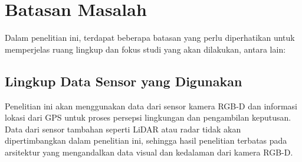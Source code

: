 \section{Batasan Masalah}
Dalam penelitian ini, terdapat beberapa batasan yang perlu diperhatikan untuk memperjelas ruang lingkup dan fokus studi yang akan dilakukan, antara lain:
\subsection{
    Lingkup Data Sensor yang Digunakan
}
Penelitian ini akan menggunakan data dari sensor kamera RGB-D dan informasi lokasi dari GPS untuk proses persepsi lingkungan dan pengambilan keputusan. Data dari sensor tambahan seperti LiDAR atau radar tidak akan dipertimbangkan dalam penelitian ini, sehingga hasil penelitian terbatas pada arsitektur yang mengandalkan data visual dan kedalaman dari kamera RGB-D.
